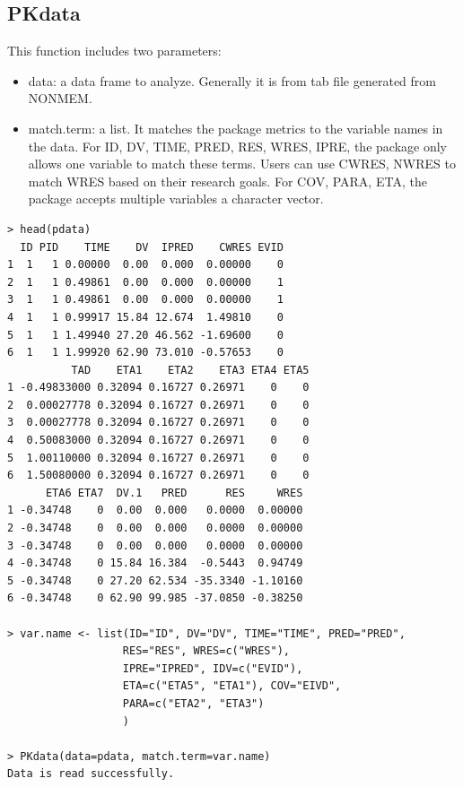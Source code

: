 \documentclass[a4paper]{article}
\begin{document}
\subsection{PKdata}
This function includes two parameters:
\begin{itemize}
	\item data: a data frame to analyze. Generally it is from tab file generated from NONMEM.
	\item match.term: a list. It matches the package metrics to the variable names in the data. 
	For ID, DV, TIME, PRED, RES, WRES, IPRE, the package only allows one variable to match 
	these terms. Users can use CWRES, NWRES to match WRES based on their research goals. 
	For COV, PARA, ETA, the package accepts multiple variables a character vector.
\end{itemize}


\begin{verbatim}
> head(pdata)
  ID PID    TIME    DV  IPRED    CWRES EVID
1  1   1 0.00000  0.00  0.000  0.00000    0
2  1   1 0.49861  0.00  0.000  0.00000    1
3  1   1 0.49861  0.00  0.000  0.00000    1
4  1   1 0.99917 15.84 12.674  1.49810    0
5  1   1 1.49940 27.20 46.562 -1.69600    0
6  1   1 1.99920 62.90 73.010 -0.57653    0
          TAD    ETA1    ETA2    ETA3 ETA4 ETA5
1 -0.49833000 0.32094 0.16727 0.26971    0    0
2  0.00027778 0.32094 0.16727 0.26971    0    0
3  0.00027778 0.32094 0.16727 0.26971    0    0
4  0.50083000 0.32094 0.16727 0.26971    0    0
5  1.00110000 0.32094 0.16727 0.26971    0    0
6  1.50080000 0.32094 0.16727 0.26971    0    0
      ETA6 ETA7  DV.1   PRED      RES     WRES
1 -0.34748    0  0.00  0.000   0.0000  0.00000
2 -0.34748    0  0.00  0.000   0.0000  0.00000
3 -0.34748    0  0.00  0.000   0.0000  0.00000
4 -0.34748    0 15.84 16.384  -0.5443  0.94749
5 -0.34748    0 27.20 62.534 -35.3340 -1.10160
6 -0.34748    0 62.90 99.985 -37.0850 -0.38250

> var.name <- list(ID="ID", DV="DV", TIME="TIME", PRED="PRED",
                  RES="RES", WRES=c("WRES"),
                  IPRE="IPRED", IDV=c("EVID"),
                  ETA=c("ETA5", "ETA1"), COV="EIVD",
                  PARA=c("ETA2", "ETA3")
                  )

> PKdata(data=pdata, match.term=var.name)
Data is read successfully.
\end{verbatim}
\end{document}
